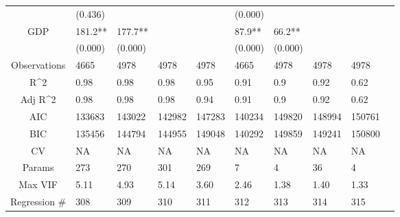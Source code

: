 \documentclass{article}
\begin{document}
\begin{table}[H]
\begin{tabular}{|clllllllll|}
   & (0.436) &  &  &  & (0.000) &  &  &  & \\ 
  GDP & 181.2** & 177.7** &  &  & 87.9** & 66.2** &  &  & \\ 
   & (0.000) & (0.000) &  &  & (0.000) & (0.000) &  &  & \\ 
  \hline 
 Observations & 4665 & 4978 & 4978 & 4978 & 4665 & 4978 & 4978 & 4978 & \\ 
  R^2 & 0.98 & 0.98 & 0.98 & 0.95 & 0.91 & 0.9 & 0.92 & 0.62 & \\ 
  Adj R^2 & 0.98 & 0.98 & 0.98 & 0.94 & 0.91 & 0.9 & 0.92 & 0.62 & \\ 
  AIC & 133683 & 143022 & 142982 & 147283 & 140234 & 149820 & 148994 & 150761 & \\ 
  BIC & 135456 & 144794 & 144955 & 149048 & 140292 & 149859 & 149241 & 150800 & \\ 
  CV & NA & NA & NA & NA & NA & NA & NA & NA & \\ 
  Params & 273 & 270 & 301 & 269 & 7 & 4 & 36 & 4 & \\ 
  Max VIF & 5.11 & 4.93 & 5.14 & 3.60 & 2.46 & 1.38 & 1.40 & 1.33 & \\ 
  Regression \# & 308 & 309 & 310 & 311 & 312 & 313 & 314 & 315 & \\ 
   \hline
\end{tabular}
 
\end{table}
\end{document}
